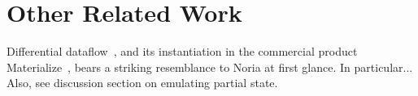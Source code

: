\section{Other Related Work}

%

%
\begin{comment}
Shared Arrangements:
http://www.vldb.org/pvldb/vol13/p1793-mcsherry.pdf
\end{comment}

Differential dataflow~\cite{naiad,differential-dataflow}, and its instantiation
in the commercial product Materialize~\cite{materialize}, bears a striking
resemblance to Noria at first glance. In particular... Also, see discussion
section on emulating partial state.
